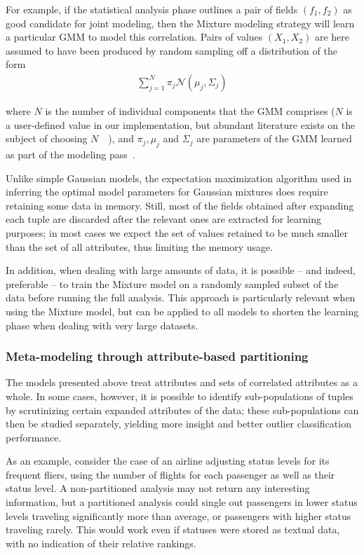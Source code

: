 For example, if the statistical analysis phase outlines a pair of fields $(f_1, f_2)$ as good candidate for joint modeling, then the Mixture modeling strategy will learn a particular GMM to model this correlation. Pairs of values $(X_1, X_2)$ are here assumed to have been produced by random sampling off a distribution of the form
\begin{align*}
\sum_{j=1}^{N} \pi_j \mathcal N(\mu_j, \Sigma_j)
\end{align*}

where $N$ is the number of individual components that the GMM comprises ($N$ is a user-defined value in our implementation, but abundant literature exists on the subject of choosing $N$~\cite{Schwartz1978}~\cite{Akaike1974}), and $\pi_j, \mu_j$ and $\Sigma_j$ are parameters of the GMM learned as part of the modeling pass~\cite{Dempster1977}.

Unlike simple Gaussian models, the expectation maximization algorithm used in inferring the optimal model parameters for Gaussian mixtures does require retaining some data in memory. Still, most of the fields obtained after expanding each tuple are discarded after the relevant ones are extracted for learning purposes; in most cases we expect the set of values retained to be much smaller than the set of all attributes, thus limiting the memory usage.

In addition, when dealing with large amounts of data, it is possible -- and indeed, preferable -- to train the Mixture model on a randomly sampled subset of the data before running the full analysis. This approach is particularly relevant when using the Mixture model, but can be applied to all models to shorten the learning phase when dealing with very large datasets.

\subsubsection{Meta-modeling through attribute-based partitioning}
\label{sec:partitioning}

The models presented above treat attributes and sets of correlated attributes as a whole. In some cases, however, it is possible to identify sub-populations of tuples by scrutinizing certain expanded attributes of the data; these sub-populations can then be studied separately, yielding more insight and better outlier classification performance.

As an example, consider the case of an airline adjusting status levels for its frequent fliers, using the number of flights for each passenger as well as their status level. A non-partitioned analysis may not return any interesting information, but a partitioned analysis could single out passengers in lower status levels traveling significantly more than average, or passengers with higher status traveling rarely. This would work even if statuses were stored as textual data, with no indication of their relative rankings.

